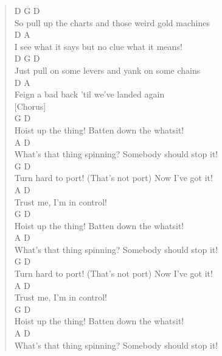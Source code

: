 \documentclass[11pt]{article}
\begin{document}
\begin{verse}
\hspace*{3em}D                            G             D\\
So pull up the charts and those weird gold machines\\
\hspace*{2em}D                       A\\
I see what it says but no clue what it means!\\
\hspace*{5em}D                       G            D\\
Just pull on some levers and yank on some chains\\
D                           A\\
Feign a bad back 'til we've landed again\\
\vspace*{1em}
[Chorus]\\
G                   D\\
Hoist up the thing! Batten down the whatsit!\\
A                               D\\
What's that thing spinning? Somebody should stop it!\\
G                                    D\\
Turn hard to port! (That's not port) Now I've got it!\\
A                   D\\
Trust me, I'm in control!\\
\vspace*{1em}
G                   D\\
Hoist up the thing! Batten down the whatsit!\\
A                               D\\
What's that thing spinning? Somebody should stop it!\\
G                                    D\\
Turn hard to port! (That's not port) Now I've got it!\\
A                   D\\
Trust me, I'm in control!\\
\vspace*{1em}
G                   D\\
Hoist up the thing! Batten down the whatsit!\\
A                               D\\
What's that thing spinning? Somebody should stop it!\\

\end{verse}
\end{document}

